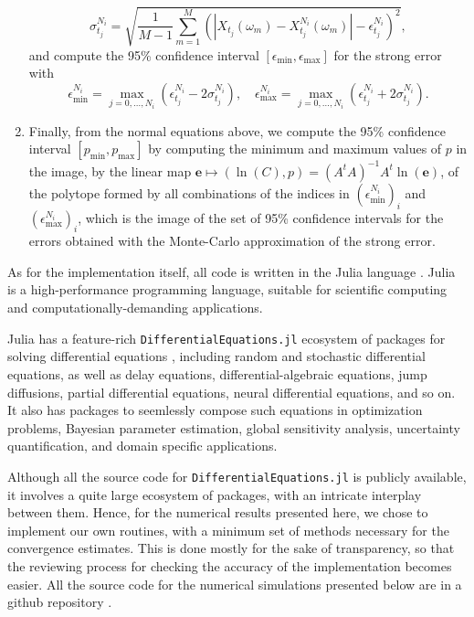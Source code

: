 \documentclass[reqno,12pt]{amsart}
\theoremstyle{plain} %
\theoremstyle{definition} %
\begin{document}
\begin{enumerate}
    \[
        \sigma_{t_j}^{N_i} = \sqrt{\frac{1}{M-1}\sum_{m=1}^M \left(\left|X_{t_j}(\omega_m) - X_{t_j}^{N_i}(\omega_m) \right|- \epsilon_{t_j}^{N_i}\right)^2},
    \]
    and compute the 95\% confidence interval $[\epsilon_{\min}, \epsilon_{\max}]$ for the strong error with
    \[
        \epsilon_{\min}^{N_i} = \max_{j=0, \ldots, N_i} (\epsilon_{t_j}^{N_i} - 2\sigma_{t_j}^{N_i}), \quad \epsilon_{\max}^{N_i} = \max_{j=0, \ldots, N_i} (\epsilon_{t_j}^{N_i} + 2\sigma_{t_j}^{N_i}).
    \]
    \item Finally, from the normal equations above, we compute the 95\% confidence interval $[p_{\min}, p_{\max}]$ by computing the minimum and maximum values of $p$ in the image, by the linear map $\mathbf{e} \mapsto (\ln(C), p) = (A^tA)^{-1}A^t\ln(\mathbf{e})$, of the polytope formed by all combinations of the indices in $(\epsilon_{\min}^{N_i})_i$ and $(\epsilon_{\max}^{N_i})_i$, which is the image of the set of 95\% confidence intervals for the errors obtained with the Monte-Carlo approximation of the strong error.
\end{enumerate}

As for the implementation itself, all code is written in the Julia language \cite{Julia2017}. Julia is a high-performance programming language, suitable for scientific computing and computationally-demanding applications.

Julia has a feature-rich \texttt{DifferentialEquations.jl} ecosystem of packages for solving differential equations \cite{RackauckasNie2017}, including random and stochastic differential equations, as well as delay equations, differential-algebraic equations, jump diffusions, partial differential equations, neural differential equations, and so on. It also has packages to seemlessly compose such equations in optimization problems, Bayesian parameter estimation, global sensitivity analysis, uncertainty quantification, and domain specific applications.

Although all the source code for \texttt{DifferentialEquations.jl} is publicly available, it involves a quite large ecosystem of packages, with an intricate interplay between them. Hence, for the numerical results presented here, we chose to implement our own routines, with a minimum set of methods necessary for the convergence estimates. This is done mostly for the sake of transparency, so that the reviewing process for checking the accuracy of the implementation becomes easier. All the source code for the numerical simulations presented below are in a github repository \cite{RODEConvEM2023}.
\end{document}
